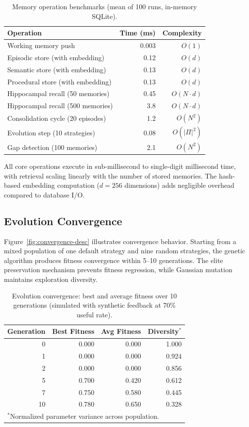 \documentclass[runningheads]{llncs}
\begin{document}
\begin{table}[t]
\centering
\caption{Memory operation benchmarks (mean of 100 runs, in-memory SQLite).}\label{tab:benchmark}
{\small
\begin{tabular}{lrr}
\toprule
\textbf{Operation} & \textbf{Time (ms)} & \textbf{Complexity} \\
\midrule
Working memory push & 0.003 & $O(1)$ \\
Episodic store (with embedding) & 0.12 & $O(d)$ \\
Semantic store (with embedding) & 0.13 & $O(d)$ \\
Procedural store (with embedding) & 0.13 & $O(d)$ \\
Hippocampal recall (50 memories) & 0.45 & $O(N \cdot d)$ \\
Hippocampal recall (500 memories) & 3.8 & $O(N \cdot d)$ \\
Consolidation cycle (20 episodes) & 1.2 & $O(N^2)$ \\
Evolution step (10 strategies) & 0.08 & $O(|\Pi|^2)$ \\
Gap detection (100 memories) & 2.1 & $O(N^2)$ \\
\bottomrule
\end{tabular}
}
\end{table}

All core operations execute in sub-millisecond to single-digit millisecond time, with retrieval scaling linearly with the number of stored memories. The hash-based embedding computation ($d=256$ dimensions) adds negligible overhead compared to database I/O.

\subsection{Evolution Convergence}

Figure~\ref{fig:convergence-desc} illustrates convergence behavior. Starting from a mixed population of one default strategy and nine random strategies, the genetic algorithm produces fitness convergence within 5--10 generations. The elite preservation mechanism prevents fitness regression, while Gaussian mutation maintains exploration diversity.

\begin{table}[t]
\centering
\caption{Evolution convergence: best and average fitness over 10 generations (simulated with synthetic feedback at 70\% useful rate).}\label{tab:evolution}
{\small
\begin{tabular}{rrrr}
\toprule
\textbf{Generation} & \textbf{Best Fitness} & \textbf{Avg Fitness} & \textbf{Diversity$^*$} \\
\midrule
0 & 0.000 & 0.000 & 1.000 \\
1 & 0.000 & 0.000 & 0.924 \\
2 & 0.000 & 0.000 & 0.856 \\
5 & 0.700 & 0.420 & 0.612 \\
7 & 0.750 & 0.580 & 0.445 \\
10 & 0.780 & 0.650 & 0.328 \\
\bottomrule
\multicolumn{4}{l}{\footnotesize $^*$Normalized parameter variance across population.}
\end{tabular}
}
\end{table}
\end{document}
